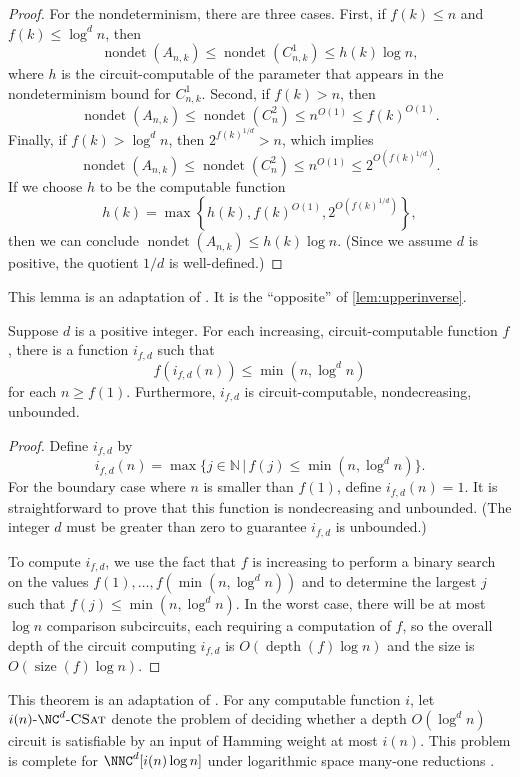 \documentclass{article}
\newcommand{\dash}{\textnormal{-}}
\DeclareMathOperator{\depth}{depth}
\DeclareMathOperator{\nondet}{nondet}
\DeclareMathOperator{\size}{size}
\begin{document}
\begin{proof}
  For the nondeterminism, there are three cases.
  First, if $f(k) \leq n$ and $f(k) \leq \log^d n$, then
  \[
  \nondet(A_{n, k}) \leq \nondet(C^1_{n, k}) \leq h(k) \log n,
  \]
  where $h$ is the circuit-computable of the parameter that appears in the nondeterminism bound for $C^1_{n, k}$.
  Second, if $f(k) > n$, then
  \[
  \nondet(A_{n, k}) \leq \nondet(C^2_n) \leq n^{O(1)} \leq f(k)^{O(1)}.
  \]
  Finally, if $f(k) > \log^d n$, then $2^{f(k)^{1 / d}} > n$, which implies
  \[
  \nondet(A_{n, k}) \leq \nondet(C^2_n) \leq n^{O(1)} \leq 2^{O\left(f(k)^{1 / d}\right)}.
  \]
  If we choose $h$ to be the computable function
  \[
  h(k) = \max \left\{ h(k), f(k)^{O(1)}, 2^{O\left(f(k)^{1 / d}\right)} \right\},
  \]
  then we can conclude $\nondet(A_{n, k}) \leq h(k) \log n$.
  (Since we assume $d$ is positive, the quotient $1 / d$ is well-defined.)
\end{proof}

This lemma is an adaptation of \autocite[Lemma~3.24]{fg06}.
It is the ``opposite'' of \autoref{lem:upperinverse}.

\begin{lemma}\label{lem:lowerinverse}
  Suppose $d$ is a positive integer.
  For each increasing, circuit-computable function $f$, there is a function $i_{f, d}$ such that
  \[
  f(i_{f, d}(n)) \leq \min(n, \log^d n)
  \]
  for each $n \geq f(1)$.
  Furthermore, $i_{f, d}$ is circuit-computable, nondecreasing, unbounded.
\end{lemma}
\begin{proof}
  Define $i_{f, d}$ by
  \[
  i_{f, d}(n) = \max\{ j \in \mathbb{N} \, | \, f(j) \leq \min(n, \log^d n) \}.
  \]
  For the boundary case where $n$ is smaller than $f(1)$, define $i_{f, d}(n) = 1$.
  It is straightforward to prove that this function is nondecreasing and unbounded.
  (The integer $d$ must be greater than zero to guarantee $i_{f, d}$ is unbounded.)

  To compute $i_{f, d}$, we use the fact that $f$ is increasing to perform a binary search on the values $f(1), \dotsc, f(\min(n, \log^d n))$ and to determine the largest $j$ such that $f(j) \leq \min(n, \log^d n)$.
  In the worst case, there will be at most $\log n$ comparison subcircuits, each requiring a computation of $f$, so the overall depth of the circuit computing $i_{f, d}$ is $O(\depth(f) \log n)$ and the size is $O(\size(f) \log n)$.
\end{proof}

This theorem is an adaptation of \autocite[Theorem~3.29]{fg06}.
For any computable function $i$, let $i(n) \dash \NC^d \dash \textsc{CSat}$ denote the problem of deciding whether a depth $O(\log^d n)$ circuit is satisfiable by an input of Hamming weight at most $i(n)$.
This problem is complete for $\NNC^d[i(n) \log n]$ under logarithmic space many-one reductions \autocite[Theorem~3.6]{cc97lim}.
\end{document}
